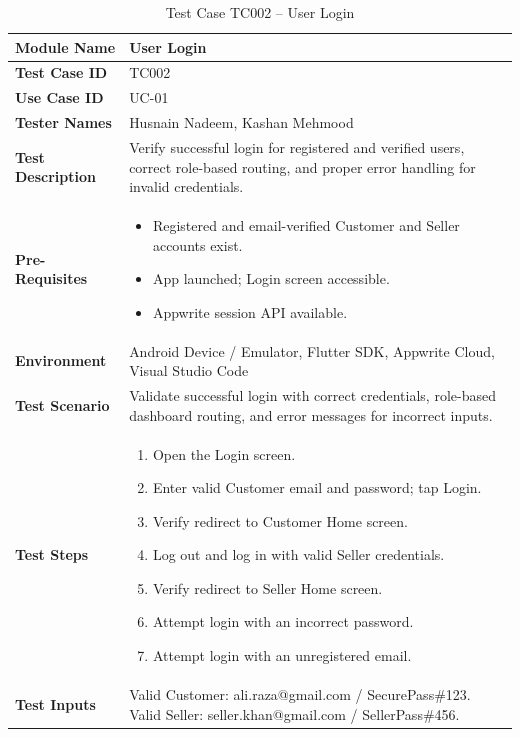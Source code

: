 \begin{table}[H]
\centering
\caption{Test Case TC002 -- User Login}
\label{tab:tc002}
\renewcommand{\arraystretch}{1.15}
\small
\begin{tabular}{|p{3.2cm}|p{10.8cm}|}
\hline
\textbf{Module Name} & User Login \\ \hline
\textbf{Test Case ID} & TC002 \\ \hline
\textbf{Use Case ID} & UC-01 \\ \hline
\textbf{Tester Names} & Husnain Nadeem, Kashan Mehmood \\ \hline
\textbf{Test Description} & Verify successful login for registered and verified users, correct role-based routing, and proper error handling for invalid credentials. \\ \hline
\textbf{Pre-Requisites} &
\begin{itemize}[leftmargin=*,noitemsep]
\item Registered and email-verified Customer and Seller accounts exist.
\item App launched; Login screen accessible.
\item Appwrite session API available.
\end{itemize} \\ \hline
\textbf{Environment} & Android Device / Emulator, Flutter SDK, Appwrite Cloud, Visual Studio Code \\ \hline
\textbf{Test Scenario} & Validate successful login with correct credentials, role-based dashboard routing, and error messages for incorrect inputs. \\ \hline
\textbf{Test Steps} &
\begin{enumerate}[leftmargin=*,noitemsep]
\item Open the Login screen.
\item Enter valid Customer email and password; tap Login.
\item Verify redirect to Customer Home screen.
\item Log out and log in with valid Seller credentials.
\item Verify redirect to Seller Home screen.
\item Attempt login with an incorrect password.
\item Attempt login with an unregistered email.
\end{enumerate} \\ \hline
\textbf{Test Inputs} &
Valid Customer: ali.raza@gmail.com / SecurePass\#123. \newline
Valid Seller: seller.khan@gmail.com / SellerPass\#456. \newline

\end{tabular}
\end{table}
